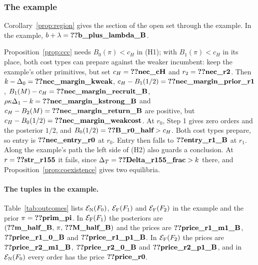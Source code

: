 \subsubsection*{The example}

Corollary~\ref{prop:region} gives the section of the open set through the example. In the example,
\(b+\lambda=\reg{b_plus_lambda_B}\).

Proposition~\ref{prop:ccc} needs \(B_0(\pi)<c_H\) in (H1); with \(B_1(\pi)<c_H\) in its place, both cost types
can prepare against the weaker incumbent: keep the example's other primitives,
but set \(c_H=\reg{nec_cH}\) and \(r_2=\reg{nec_r2}\). Then \(k-\Delta_0=\reg{nec_margin_kweak}\),
\(c_H-B_1(1/2)=\reg{nec_margin_prior_r1}\), \(B_1(M)-c_H=\reg{nec_margin_recruit_B}\),
\(\rho\kappa\Delta_1-k=\reg{nec_margin_kstrong_B}\) and \(c_H-B_2(M)=\reg{nec_margin_return_B}\) are positive, but
\(c_H-B_0(1/2)=\reg{nec_margin_weakcost}\). At \(r_0\), Step 1 gives zero orders and the posterior \(1/2\), and
\(B_0(1/2)=\reg{B_r0_half}>c_H\). Both cost types prepare, so entry is \(\reg{nec_entry_r0}\) at \(r_0\). Entry then
falls to \(\reg{entry_r1_B}\) at \(r_1\). Along the example's path the left side of (H2) also guards a conclusion. At
\(r=\reg{str_r155}\) it fails, since \(\DT=\reg{Delta_r155_frac}>k\) there, and Proposition~\ref{prop:coexistence}
gives two equilibria.

\paragraph{The tuples in the example.}
Table~\ref{tab:outcomes} lists \(\mathcal E_{\rm N}(F_0)\), \(\mathcal E_{\rm F}(F_1)\) and \(\mathcal E_{\rm F}(F_2)\) in the example and the prior
\(\pi=\reg{prim_pi}\). In \(\mathcal E_{\rm F}(F_1)\) the posteriors are \((\reg{m_half_B},\,\pi,\,\reg{M_half_B})\) and the
prices are \(\reg{price_r1_m1_B}\), \(\reg{price_r1_0_B}\) and \(\reg{price_r1_p1_B}\). In \(\mathcal E_{\rm F}(F_2)\) the prices
are \(\reg{price_r2_m1_B}\), \(\reg{price_r2_0_B}\) and \(\reg{price_r2_p1_B}\), and in \(\mathcal E_{\rm N}(F_0)\) every order
has the price \(\reg{price_r0}\).

